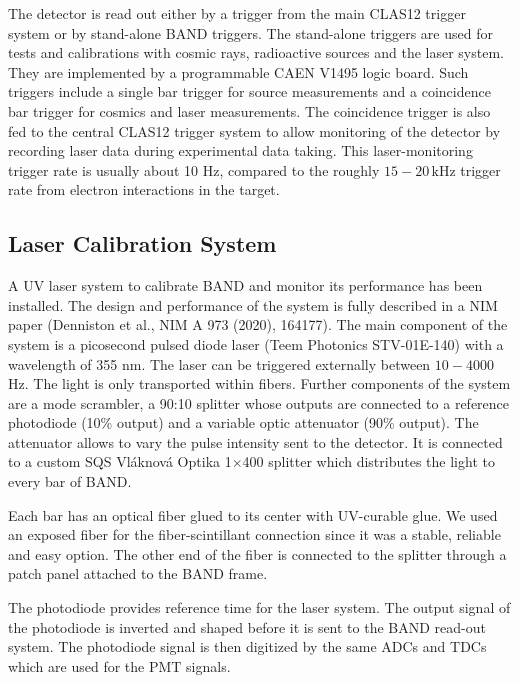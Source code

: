 \documentclass[12pt,letterpaper]{article}
\begin{document}
The detector is read out either by a trigger from the main CLAS12
trigger system or by stand-alone BAND 
triggers. The stand-alone triggers are used for tests and calibrations with cosmic rays, radioactive sources and the laser system. 
They are implemented by a programmable CAEN V1495 logic board. Such triggers include
a single bar trigger for source measurements and a
coincidence bar trigger for cosmics and laser measurements. The
coincidence trigger is also fed to the central CLAS12 trigger system
to allow monitoring of the detector by recording laser data during
experimental data taking. This laser-monitoring trigger rate is usually about 10
Hz, compared to the roughly $15-20\,\mathrm{kHz}$ trigger
rate from electron interactions in the target.




\subsection{Laser Calibration System}
A UV laser system to calibrate BAND and monitor its
performance has been installed. 
The design and performance of the system is fully 
described in a NIM paper (Denniston et al., NIM A 973 (2020), 164177). 
The main component of the system is a picosecond pulsed diode laser 
(Teem Photonics STV-01E-140) with a wavelength 
of 355 nm. The laser can be triggered externally between 
$10-4000$ Hz. The light is only transported within fibers. Further components of the system are a mode scrambler, a 90:10 splitter whose outputs are connected to a reference photodiode (10\% output) and a variable optic attenuator (90\% output). The attenuator allows to vary the pulse intensity sent to the detector. It is connected to a custom SQS Vl\'aknov\'a Optika 1$\times$400 splitter which distributes the light to every bar of BAND. 

Each bar has an optical fiber glued to its center with UV-curable glue. We used an exposed fiber for the fiber-scintillant connection since it was a stable, reliable and easy option. The other end of the fiber is connected to the splitter through a patch panel attached to the BAND frame. 

The photodiode provides reference time for the laser system. The output
signal of the photodiode is inverted and shaped before it is sent to
the BAND read-out system. The photodiode signal is then digitized by the same ADCs and
TDCs which are used for the PMT signals.
\end{document}
